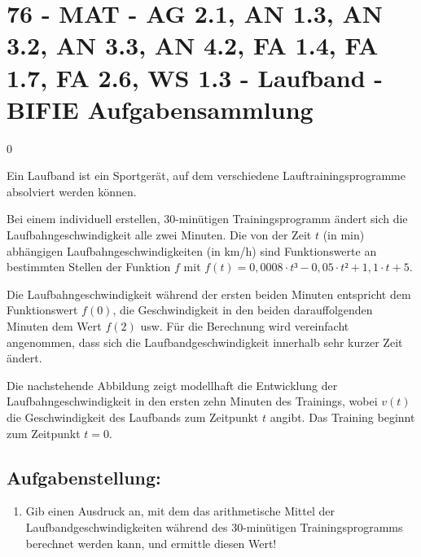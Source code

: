 \section{76 - MAT - AG 2.1, AN 1.3, AN 3.2, AN 3.3, AN 4.2, FA 1.4, FA 1.7, FA 2.6, WS 1.3 - Laufband - BIFIE Aufgabensammlung}

\begin{langesbeispiel} \item[0] %
	
Ein Laufband ist ein Sportgerät, auf dem verschiedene Lauftrainingsprogramme absolviert werden können.

Bei einem individuell erstellen, 30-minütigen Trainingsprogramm ändert sich die Laufbahngeschwindigkeit alle zwei Minuten. Die von der Zeit $t$ (in min) abhängigen Laufbahngeschwindigkeiten (in km/h) sind Funktionswerte an bestimmten Stellen der Funktion $f$ mit $f(t)=0,0008\cdot t³-0,05\cdot t²+1,1\cdot t+5$.

Die Laufbahngeschwindigkeit während der ersten beiden Minuten entspricht dem Funktionswert $f(0)$, die Geschwindigkeit in den beiden darauffolgenden Minuten dem Wert $f(2)$ usw. Für die Berechnung wird vereinfacht angenommen, dass sich die Laufbandgeschwindigkeit innerhalb sehr kurzer Zeit ändert.

Die nachstehende Abbildung zeigt modellhaft die Entwicklung der Laufbahngeschwindigkeit in den ersten zehn Minuten des Trainings, wobei $v(t)$ die Geschwindigkeit des Laufbands zum Zeitpunkt $t$ angibt. Das Training beginnt zum Zeitpunkt $t=0$.

\begin{center}
\end{center}

\subsection{Aufgabenstellung:}
\begin{enumerate}
	\item Gib einen Ausdruck an, mit dem das arithmetische Mittel der Laufbandgeschwindigkeiten während des 30-minütigen Trainingsprogramms berechnet werden kann, und ermittle diesen Wert!\leer
	

\end{enumerate}
\end{langesbeispiel}
